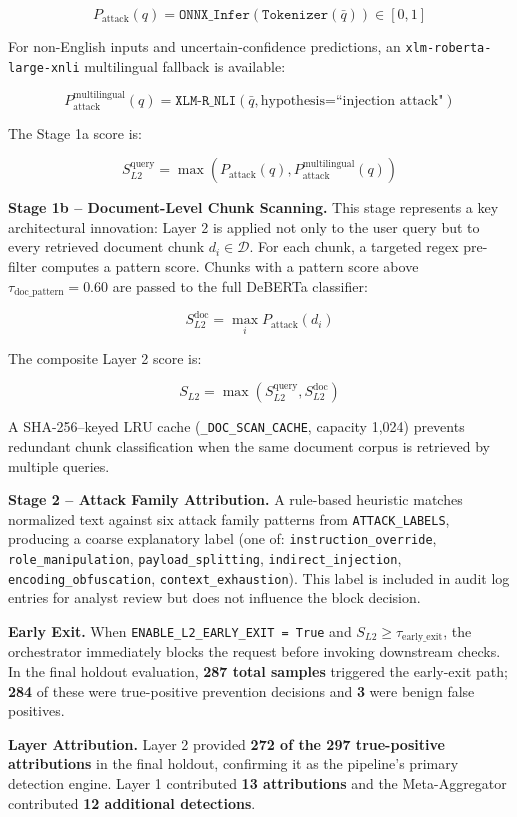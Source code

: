 \documentclass[conference]{IEEEtran}
\begin{document}
$$P_{\text{attack}}(q) = \texttt{ONNX\_Infer}(\texttt{Tokenizer}(\bar{q})) \in [0, 1]$$


For non-English inputs and uncertain-confidence predictions, an \texttt{xlm-roberta-large-xnli} multilingual fallback is available:


$$P_{\text{attack}}^{\text{multilingual}}(q) = \texttt{XLM-R\_NLI}(\bar{q}, \text{hypothesis=``injection attack"})$$


The Stage 1a score is:

$$S_{L2}^{\text{query}} = \max(P_{\text{attack}}(q), P_{\text{attack}}^{\text{multilingual}}(q))$$


\textbf{Stage 1b -- Document-Level Chunk Scanning.} This stage represents a key architectural innovation: Layer 2 is applied not only to the user query but to every retrieved document chunk $d_i \in \mathcal{D}$. For each chunk, a targeted regex pre-filter computes a pattern score. Chunks with a pattern score above $\tau_{\text{doc\_pattern}} = 0.60$ are passed to the full DeBERTa classifier:


$$S_{L2}^{\text{doc}} = \max_{i} P_{\text{attack}}(d_i)$$


The composite Layer 2 score is:

$$S_{L2} = \max(S_{L2}^{\text{query}}, S_{L2}^{\text{doc}})$$


A SHA-256--keyed LRU cache (\texttt{\_DOC\_SCAN\_CACHE}, capacity 1,024) prevents redundant chunk classification when the same document corpus is retrieved by multiple queries.


\textbf{Stage 2 -- Attack Family Attribution.} A rule-based heuristic matches normalized text against six attack family patterns from \texttt{ATTACK\_LABELS}, producing a coarse explanatory label (one of: \texttt{instruction\_override}, \texttt{role\_manipulation}, \texttt{payload\_splitting}, \texttt{indirect\_injection}, \texttt{encoding\_obfuscation}, \texttt{context\_exhaustion}). This label is included in audit log entries for analyst review but does not influence the block decision.


\textbf{Early Exit.} When \texttt{ENABLE\_L2\_EARLY\_EXIT = True} and $S_{L2} \geq \tau_{\text{early\_exit}}$, the orchestrator immediately blocks the request before invoking downstream checks. In the final holdout evaluation, \textbf{287 total samples} triggered the early-exit path; \textbf{284} of these were true-positive prevention decisions and \textbf{3} were benign false positives.


\textbf{Layer Attribution.} Layer 2 provided \textbf{272 of the 297 true-positive attributions} in the final holdout, confirming it as the pipeline's primary detection engine. Layer 1 contributed \textbf{13 attributions} and the Meta-Aggregator contributed \textbf{12 additional detections}.
\end{document}
